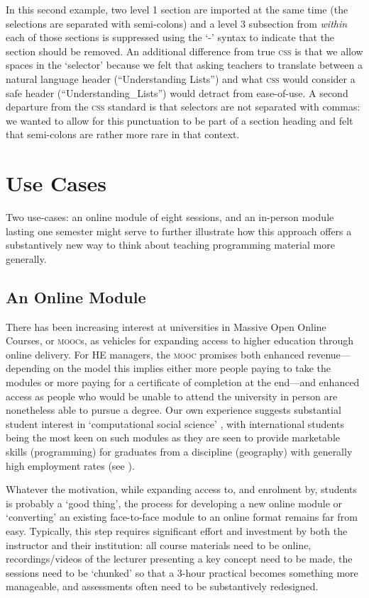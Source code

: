 \documentclass[letter, 11pt]{article}
\begin{document}
In this second example, two level 1 section are imported at the same time (the
selections are separated with semi-colons) and a level 3 subsection from
\emph{within} each of those sections is suppressed using the `-' syntax to
indicate that the section should be removed. An additional difference from true
\textsc{css} is that we allow spaces in the `selector' because we felt that
asking teachers to translate between a natural language header (``Understanding
Lists'') and what \textsc{css} would consider a safe header
(``Understanding\_Lists'') would detract from ease-of-use. A second departure
from the \textsc{css} standard is that selectors are not separated with commas:
we wanted to allow for this punctuation to be part of a section heading and felt
that semi-colons are rather more rare in that context.

\section{Use Cases}\label{uses}

Two use-cases: an online module of eight sessions, and an in-person module
lasting one semester might serve to further illustrate how this approach offers
a substantively new way to think about teaching programming material more
generally.

\subsection{An Online Module}\label{an-online-module}

There has been increasing interest at universities in Massive Open Online
Courses, or \textsc{mooc}s, as vehicles for expanding access to higher education
through online delivery. For HE managers, the \textsc{mooc} promises both
enhanced revenue---depending on the model this implies either more people paying
to take the modules or more paying for a certificate of completion at the
end---and enhanced access as people who would be unable to attend the university
in person are nonetheless able to pursue a degree. Our own experience suggests
substantial student interest in `computational social science'
\citep{Lazer2009}, with international students being the most keen on such
modules as they are seen to provide marketable skills (programming) for
graduates from a discipline (geography) with generally high employment rates
(see \citeauthor{rgs2017} \citeyear{rgs2017}).

Whatever the motivation, while expanding access to, and enrolment by, students
is probably a `good thing', the process for developing a new online module or
`converting' an existing face-to-face module to an online format remains far
from easy. Typically, this step requires significant effort and investment by
both the instructor and their institution: all course materials need to be
online, recordings/videos of the lecturer presenting a key concept need to be
made, the sessions need to be `chunked' so that a 3-hour practical becomes
something more manageable, and assessments often need to be substantively
redesigned.
\end{document}
